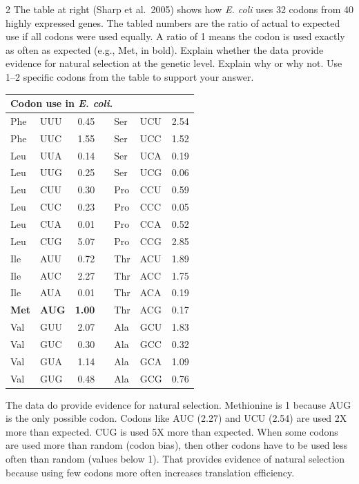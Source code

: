 \documentclass[12pt, addpoints]{exam}
\begin{document}
\begin{questions}
\begin{multicols}{2}
\flushleft
The table at right (Sharp et al.~2005) shows how \textit{E. coli} uses 32 codons from 40 highly expressed genes. The tabled numbers are the ratio of actual to expected use if all codons were used equally. A ratio of 1 means the codon is used exactly as often as expected (e.g., Met, in bold). Explain whether the data provide evidence for natural selection at the genetic level. Explain why or why not. Use 1--2 specific codons from the table to support your answer.
\columnbreak
{
\begin{tabular}{@{}llrcllr@{}}
	\toprule
	\multicolumn{7}{l}{Codon use in \textit{E. coli}.}\\
	\midrule
	Phe & UUU & 0.45 &  & Ser & UCU & 2.54\\
Phe & UUC & 1.55 &  & Ser & UCC & 1.52\\
Leu & UUA & 0.14 &  & Ser & UCA & 0.19\\
Leu & UUG & 0.25 &  & Ser & UCG & 0.06\\
Leu & CUU & 0.30 &  & Pro & CCU & 0.59\\
Leu & CUC & 0.23 &  & Pro & CCC & 0.05\\
Leu & CUA & 0.01 &  & Pro & CCA & 0.52\\
Leu & CUG & 5.07 &  & Pro & CCG & 2.85\\
Ile & AUU & 0.72 &  & Thr & ACU & 1.89\\
Ile & AUC & 2.27 &  & Thr & ACC & 1.75\\
Ile & AUA & 0.01 &  & Thr & ACA & 0.19\\
\textbf{Met} & \textbf{AUG} & \textbf{1.00} &  & Thr & ACG & 0.17\\
Val & GUU & 2.07 &  & Ala & GCU & 1.83\\
Val & GUC & 0.30 &  & Ala & GCC & 0.32\\
Val & GUA & 1.14 &  & Ala & GCA & 1.09\\
Val & GUG & 0.48 &  & Ala & GCG & 0.76\\
	\bottomrule
	\end{tabular}}
\end{multicols}
	\begin{solution}
	The data do provide evidence for natural selection. Methionine is 1 because AUG is the only possible codon. Codons like AUC (2.27) and UCU (2.54) are used 2X more than expected. CUG is used 5X more than expected. When some codons are used more than random (codon bias), then other codons have to be used less often than random (values below 1). That provides evidence of natural selection because using few codons more often increases translation efficiency.
	\end{solution}


\end{questions}
\end{document}
